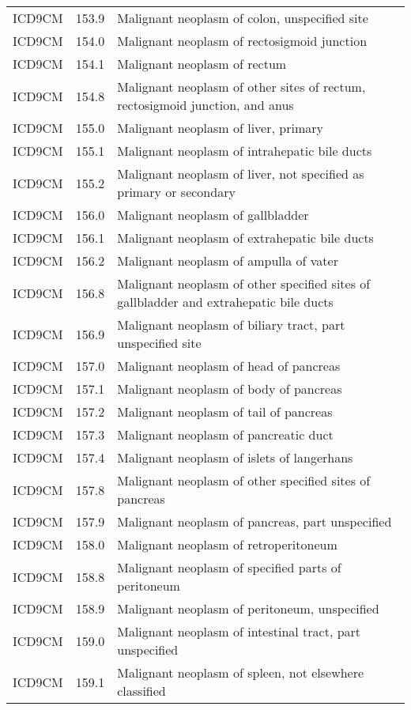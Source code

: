 \begin{longtable}{p{}p{}p{}}
  ICD9CM & 153.9 & Malignant neoplasm of colon, unspecified site \\ 
  ICD9CM & 154.0 & Malignant neoplasm of rectosigmoid junction \\ 
  ICD9CM & 154.1 & Malignant neoplasm of rectum \\ 
  ICD9CM & 154.8 & Malignant neoplasm of other sites of rectum, rectosigmoid junction, and anus \\ 
  ICD9CM & 155.0 & Malignant neoplasm of liver, primary \\ 
  ICD9CM & 155.1 & Malignant neoplasm of intrahepatic bile ducts \\ 
  ICD9CM & 155.2 & Malignant neoplasm of liver, not specified as primary or secondary \\ 
  ICD9CM & 156.0 & Malignant neoplasm of gallbladder \\ 
  ICD9CM & 156.1 & Malignant neoplasm of extrahepatic bile ducts \\ 
  ICD9CM & 156.2 & Malignant neoplasm of ampulla of vater \\ 
  ICD9CM & 156.8 & Malignant neoplasm of other specified sites of gallbladder and extrahepatic bile ducts \\ 
  ICD9CM & 156.9 & Malignant neoplasm of biliary tract, part unspecified site \\ 
  ICD9CM & 157.0 & Malignant neoplasm of head of pancreas \\ 
  ICD9CM & 157.1 & Malignant neoplasm of body of pancreas \\ 
  ICD9CM & 157.2 & Malignant neoplasm of tail of pancreas \\ 
  ICD9CM & 157.3 & Malignant neoplasm of pancreatic duct \\ 
  ICD9CM & 157.4 & Malignant neoplasm of islets of langerhans \\ 
  ICD9CM & 157.8 & Malignant neoplasm of other specified sites of pancreas \\ 
  ICD9CM & 157.9 & Malignant neoplasm of pancreas, part unspecified \\ 
  ICD9CM & 158.0 & Malignant neoplasm of retroperitoneum \\ 
  ICD9CM & 158.8 & Malignant neoplasm of specified parts of peritoneum \\ 
  ICD9CM & 158.9 & Malignant neoplasm of peritoneum, unspecified \\ 
  ICD9CM & 159.0 & Malignant neoplasm of intestinal tract, part unspecified \\ 
  ICD9CM & 159.1 & Malignant neoplasm of spleen, not elsewhere classified \\ 

\end{longtable}

